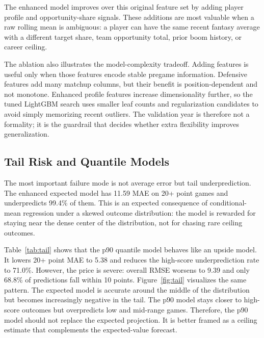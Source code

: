 \documentclass{article}
\begin{document}


The enhanced model improves over this original feature set by adding player profile and opportunity-share signals. These additions are most valuable when a raw rolling mean is ambiguous: a player can have the same recent fantasy average with a different target share, team opportunity total, prior boom history, or career ceiling.

The ablation also illustrates the model-complexity tradeoff. Adding features is useful only when those features encode stable pregame information. Defensive features add many matchup columns, but their benefit is position-dependent and not monotone. Enhanced profile features increase dimensionality further, so the tuned LightGBM search uses smaller leaf counts and regularization candidates to avoid simply memorizing recent outliers. The validation year is therefore not a formality; it is the guardrail that decides whether extra flexibility improves generalization.



\subsection{Tail Risk and Quantile Models}
The most important failure mode is not average error but tail underprediction. The enhanced expected model has 11.59 MAE on 20+ point games and underpredicts 99.4\% of them. This is an expected consequence of conditional-mean regression under a skewed outcome distribution: the model is rewarded for staying near the dense center of the distribution, not for chasing rare ceiling outcomes.



Table~\ref{tab:tail} shows that the p90 quantile model behaves like an upside model. It lowers 20+ point MAE to 5.38 and reduces the high-score underprediction rate to 71.0\%. However, the price is severe: overall RMSE worsens to 9.39 and only 68.8\% of predictions fall within 10 points. Figure~\ref{fig:tail} visualizes the same pattern. The expected model is accurate around the middle of the distribution but becomes increasingly negative in the tail. The p90 model stays closer to high-score outcomes but overpredicts low and mid-range games. Therefore, the p90 model should not replace the expected projection. It is better framed as a ceiling estimate that complements the expected-value forecast.
\end{document}
